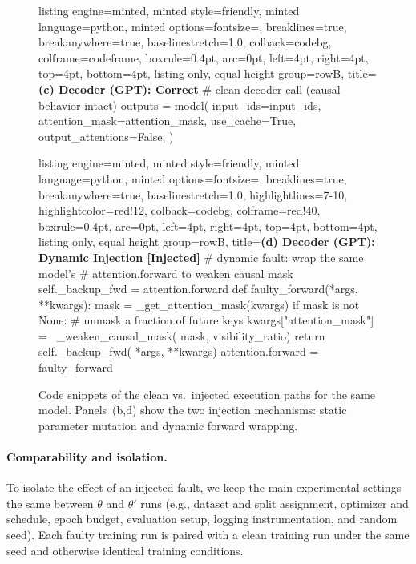 \begin{figure}[!htbp]
\begin{minipage}[t]{0.48\textwidth}
\begin{tcblisting}{
  listing engine=minted, minted style=friendly,
  minted language=python,
  minted options={fontsize=\scriptsize, breaklines=true, breakanywhere=true, baselinestretch=1.0},
  colback=codebg, colframe=codeframe, boxrule=0.4pt, arc=0pt,
  left=4pt, right=4pt, top=4pt, bottom=4pt,
  listing only, equal height group=rowB,
  title={\scriptsize\bfseries (c) Decoder (GPT): Correct}}
# clean decoder call (causal behavior intact)
outputs = model(
    input_ids=input_ids,
    attention_mask=attention_mask,
    use_cache=True,
    output_attentions=False,
)
\end{tcblisting}
\end{minipage}\hfill
\begin{minipage}[t]{0.48\textwidth}
\begin{tcblisting}{
  listing engine=minted, minted style=friendly,
  minted language=python,
  minted options={fontsize=\scriptsize, breaklines=true, breakanywhere=true, baselinestretch=1.0,
    highlightlines={7-10}, highlightcolor=red!12},
  colback=codebg, colframe=red!40, boxrule=0.4pt, arc=0pt,
  left=4pt, right=4pt, top=4pt, bottom=4pt,
  listing only, equal height group=rowB,
  title={\scriptsize\bfseries (d) Decoder (GPT): Dynamic Injection [Injected]}}
# dynamic fault: wrap the same model's
# attention.forward to weaken causal mask
self._backup_fwd = attention.forward
def faulty_forward(*args, **kwargs):
    mask = _get_attention_mask(kwargs)
    if mask is not None:
        # unmask a fraction of future keys
        kwargs["attention_mask"] = \
            _weaken_causal_mask(
                mask, visibility_ratio)
    return self._backup_fwd(
        *args, **kwargs)
attention.forward = faulty_forward
\end{tcblisting}
\end{minipage}

\caption[Clean vs.\ injected execution paths.]{Code snippets of the clean vs.\ injected execution paths for the same model. Panels~(b,d) show the two injection mechanisms: static parameter mutation and dynamic forward wrapping.}
\label{fig:injection-code-panels}
\end{figure}

\paragraph{Comparability and isolation.}
To isolate the effect of an injected fault, we keep the main experimental settings the same between $\theta$ and $\theta'$ runs (e.g., dataset and split assignment, optimizer and schedule, epoch budget, evaluation setup, logging instrumentation, and random seed). Each faulty training run is paired with a clean training run under the same seed and otherwise identical training conditions.

